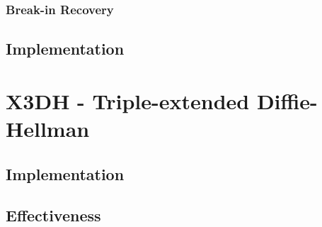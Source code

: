 \subsubsection{Break-in Recovery}


\subsection{Implementation}


\section{X3DH - Triple-extended Diffie-Hellman}


\subsection{Implementation}


\subsection{Effectiveness}




